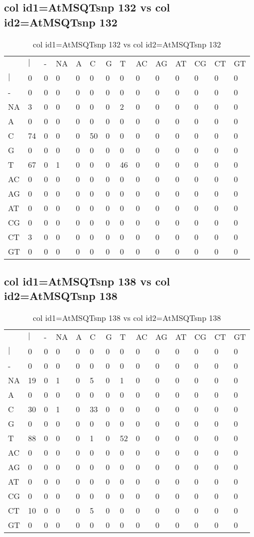 \subsection{col id1=AtMSQTsnp 132 vs col id2=AtMSQTsnp 132}
\begin{center}
\begin{longtable}{|l|l|l|l|l|l|l|l|l|l|l|l|l|l|}
\caption{col id1=AtMSQTsnp 132 vs col id2=AtMSQTsnp 132} \label{table_dm522}\\
\hline
\\
\hline
&$|$&-&NA&A&C&G&T&AC&AG&AT&CG&CT&GT\\
$|$&0&0&0&0&0&0&0&0&0&0&0&0&0\\
-&0&0&0&0&0&0&0&0&0&0&0&0&0\\
NA&3&0&0&0&0&0&2&0&0&0&0&0&0\\
A&0&0&0&0&0&0&0&0&0&0&0&0&0\\
C&74&0&0&0&50&0&0&0&0&0&0&0&0\\
G&0&0&0&0&0&0&0&0&0&0&0&0&0\\
T&67&0&1&0&0&0&46&0&0&0&0&0&0\\
AC&0&0&0&0&0&0&0&0&0&0&0&0&0\\
AG&0&0&0&0&0&0&0&0&0&0&0&0&0\\
AT&0&0&0&0&0&0&0&0&0&0&0&0&0\\
CG&0&0&0&0&0&0&0&0&0&0&0&0&0\\
CT&3&0&0&0&0&0&0&0&0&0&0&0&0\\
GT&0&0&0&0&0&0&0&0&0&0&0&0&0\\
\hline
\end{longtable}
\end{center}

\subsection{col id1=AtMSQTsnp 138 vs col id2=AtMSQTsnp 138}
\begin{center}
\begin{longtable}{|l|l|l|l|l|l|l|l|l|l|l|l|l|l|}
\caption{col id1=AtMSQTsnp 138 vs col id2=AtMSQTsnp 138} \label{table_dm524}\\
\hline
\\
\hline
&$|$&-&NA&A&C&G&T&AC&AG&AT&CG&CT&GT\\
$|$&0&0&0&0&0&0&0&0&0&0&0&0&0\\
-&0&0&0&0&0&0&0&0&0&0&0&0&0\\
NA&19&0&1&0&5&0&1&0&0&0&0&0&0\\
A&0&0&0&0&0&0&0&0&0&0&0&0&0\\
C&30&0&1&0&33&0&0&0&0&0&0&0&0\\
G&0&0&0&0&0&0&0&0&0&0&0&0&0\\
T&88&0&0&0&1&0&52&0&0&0&0&0&0\\
AC&0&0&0&0&0&0&0&0&0&0&0&0&0\\
AG&0&0&0&0&0&0&0&0&0&0&0&0&0\\
AT&0&0&0&0&0&0&0&0&0&0&0&0&0\\
CG&0&0&0&0&0&0&0&0&0&0&0&0&0\\
CT&10&0&0&0&5&0&0&0&0&0&0&0&0\\
GT&0&0&0&0&0&0&0&0&0&0&0&0&0\\
\hline
\end{longtable}
\end{center}

